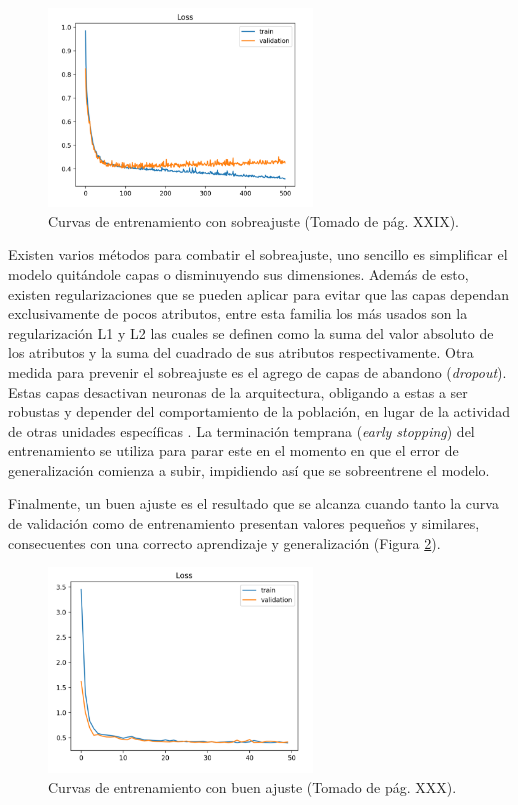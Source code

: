 \documentclass[a4paper,11pt,twocolumn,twoside]{article}
\begin{document}
\begin{figure}[h]
	\centering
	\includegraphics[width=7cm,clip]{Graphics/overfit_raising_val_error.png}
	\caption{Curvas de entrenamiento con sobreajuste (Tomado de \cite{brownlee2018better} pág. XXIX).}
	\label{fig:overfit}
\end{figure}

Existen varios métodos para combatir el sobreajuste, uno sencillo es simplificar el modelo quitándole capas 
o disminuyendo sus dimensiones. Además de esto, existen regularizaciones que se pueden aplicar para evitar que 
las capas dependan exclusivamente de pocos atributos, entre esta familia los más usados son la regularización
L1 y L2 las cuales se definen como la suma del valor absoluto de los atributos y la suma del cuadrado de sus 
atributos respectivamente. Otra medida para prevenir el sobreajuste es el agrego de capas de abandono 
(\textit{dropout}). Estas capas desactivan neuronas de la arquitectura, obligando a 
estas a ser robustas y depender del comportamiento de la población, en lugar de la actividad de otras unidades 
específicas \cite{baldi2013dropout}. La terminación temprana (\textit{early stopping}) del entrenamiento
se utiliza para parar este en el momento en que el error de generalización comienza a subir, impidiendo así que 
se sobreentrene el modelo.

Finalmente, un buen ajuste es el resultado que se alcanza cuando tanto la curva de validación como de entrenamiento
presentan valores pequeños y similares, consecuentes con una correcto aprendizaje y generalización (Figura \ref{fig:good_fit}).

\begin{figure}[h]
	\centering
	\includegraphics[width=7cm,clip]{Graphics/good_fit.png}
	\caption{Curvas de entrenamiento con buen ajuste (Tomado de \cite{brownlee2018better} pág. XXX).}
	\label{fig:good_fit}
\end{figure}
\end{document}
